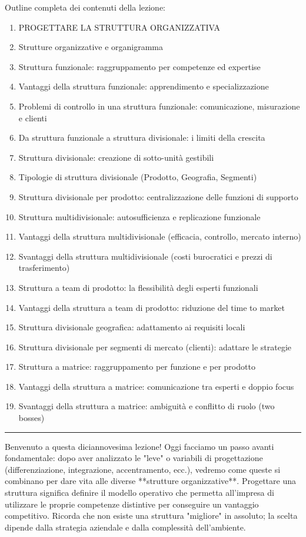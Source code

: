 \documentclass[a4paper,10pt]{article}
\begin{document}
Outline completa dei contenuti della lezione:
{\small
\begin{enumerate}
\item PROGETTARE LA STRUTTURA ORGANIZZATIVA
\item Strutture organizzative e organigramma
\item Struttura funzionale: raggruppamento per competenze ed expertise
\item Vantaggi della struttura funzionale: apprendimento e specializzazione
\item Problemi di controllo in una struttura funzionale: comunicazione, misurazione e clienti
\item Da struttura funzionale a struttura divisionale: i limiti della crescita
\item Struttura divisionale: creazione di sotto-unità gestibili
\item Tipologie di struttura divisionale (Prodotto, Geografia, Segmenti)
\item Struttura divisionale per prodotto: centralizzazione delle funzioni di supporto
\item Struttura multidivisionale: autosufficienza e replicazione funzionale
\item Vantaggi della struttura multidivisionale (efficacia, controllo, mercato interno)
\item Svantaggi della struttura multidivisionale (costi burocratici e prezzi di trasferimento)
\item Struttura a team di prodotto: la flessibilità degli esperti funzionali
\item Vantaggi della struttura a team di prodotto: riduzione del time to market
\item Struttura divisionale geografica: adattamento ai requisiti locali
\item Struttura divisionale per segmenti di mercato (clienti): adattare le strategie
\item Struttura a matrice: raggruppamento per funzione e per prodotto
\item Vantaggi della struttura a matrice: comunicazione tra esperti e doppio focus
\item Svantaggi della struttura a matrice: ambiguità e conflitto di ruolo (two bosses)
\end{enumerate}
}
\hrule
\vspace{0.5cm}

Benvenuto a questa diciannovesima lezione! Oggi facciamo un passo avanti fondamentale: dopo aver analizzato le "leve" o variabili di progettazione (differenziazione, integrazione, accentramento, ecc.), vedremo come queste si combinano per dare vita alle diverse **strutture organizzative**. Progettare una struttura significa definire il modello operativo che permetta all'impresa di utilizzare le proprie competenze distintive per conseguire un vantaggio competitivo. Ricorda che non esiste una struttura "migliore" in assoluto; la scelta dipende dalla strategia aziendale e dalla complessità dell'ambiente.
\end{document}
